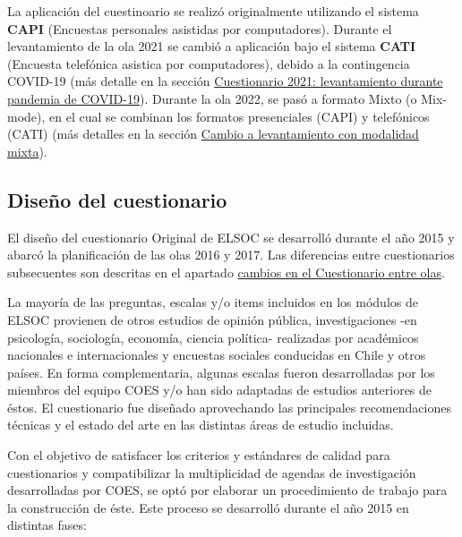 \documentclass[
  12pt,
]{article}
\begin{document}
La aplicación del cuestinoario se realizó originalmente utilizando el sistema \textbf{CAPI} (Encuestas personales asistidas por computadores). Durante el levantamiento de la ola 2021 se cambió a aplicación bajo el sistema \textbf{CATI} (Encuesta telefónica asistica por computadores), debido a la contingencia COVID-19 (más detalle en la sección \protect\hyperlink{instrumento-covid}{Cuestionario 2021: levantamiento durante pandemia de COVID-19}). Durante la ola 2022, se pasó a formato Mixto (o Mix-mode), en el cual se combinan los formatos presenciales (CAPI) y telefónicos (CATI) (más detalles en la sección \protect\hyperlink{instrumento-mixmode}{Cambio a levantamiento con modalidad mixta}).

\hypertarget{dis-cuestionario}{%
\subsection{Diseño del cuestionario}\label{dis-cuestionario}}

El diseño del cuestionario Original de ELSOC se desarrolló durante el año 2015 y abarcó la planificación de las olas 2016 y 2017. Las diferencias entre cuestionarios subsecuentes son descritas en el apartado \protect\hyperlink{dif-cuest-olas}{cambios en el Cuestionario entre olas}.

La mayoría de las preguntas, escalas y/o items incluidos en los módulos de ELSOC provienen de otros estudios de opinión pública, investigaciones -en psicología, sociología, economía, ciencia política- realizadas por académicos nacionales e internacionales y encuestas sociales conducidas en Chile y otros países. En forma complementaria, algunas escalas fueron desarrolladas por los miembros del equipo COES y/o han sido adaptadas de estudios anteriores de éstos. El cuestionario fue diseñado aprovechando las principales recomendaciones técnicas y el estado del arte en las distintas áreas de estudio incluidas.

Con el objetivo de satisfacer los criterios y estándares de calidad para cuestionarios y compatibilizar la multiplicidad de agendas de investigación desarrolladas por COES, se optó por elaborar un procedimiento de trabajo para la construcción de éste. Este proceso se desarrolló durante el año 2015 en distintas fases:
\end{document}
